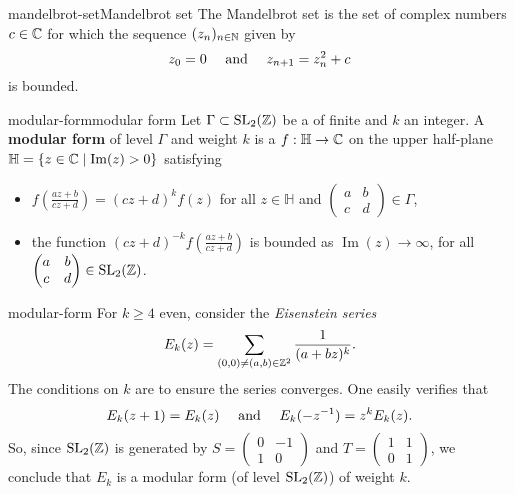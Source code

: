 \begin{topic}{mandelbrot-set}{Mandelbrot set}
    The Mandelbrot set is the set of complex numbers $c \in \mathbb{C}$ for which the sequence $(z_n)_{n \in \mathbb{N}}$ given by
    \[ z_0 = 0 \quad \textup{ and } \quad z_{n + 1} = z_n^2 + c \]
    is bounded.
\end{topic}

\begin{topic}{modular-form}{modular form}
    Let $\Gamma \subset \textup{SL}_2(\mathbb{Z})$ be a  of finite  and $k$ an integer.  A \textbf{modular form} of level $\Gamma$ and weight $k$ is a  $f : \mathbb{H} \to \mathbb{C}$ on the upper half-plane $\mathbb{H} = \{ z \in \mathbb{C} \mid \operatorname{Im}(z) > 0 \}$ satisfying
    \begin{itemize}
        \item $f\left(\frac{az + b}{cz + d}\right) = (cz + d)^k f(z)$ for all $z \in \mathbb{H}$ and $\begin{pmatrix} a & b \\ c & d \end{pmatrix} \in \Gamma$,
        \item the function $(cz + d)^{-k} f\left(\frac{az + b}{cz + d}\right)$ is bounded as $\operatorname{Im}(z) \to \infty$, for all $\begin{pmatrix} a & b \\ c & d \end{pmatrix} \in \textup{SL}_2(\mathbb{Z})$.
    \end{itemize}
\end{topic}

\begin{example}{modular-form}
    For $k \ge 4$ even, consider the \textit{Eisenstein series}
    \[ E_k(z) = \sum_{(0, 0) \ne (a, b) \in \mathbb{Z}^2} \frac{1}{(a + bz)^k} . \]
    The conditions on $k$ are to ensure the series converges. One easily verifies that
    \[ E_k(z + 1) = E_k(z) \quad \textup{ and } \quad E_k(- z^{-1}) = z^k E_k(z) . \]
    So, since $\textup{SL}_2(\mathbb{Z})$ is generated by $S = \begin{pmatrix} 0 & -1 \\ 1 & 0 \end{pmatrix}$ and $T = \begin{pmatrix} 1 & 1 \\ 0 & 1 \end{pmatrix}$, we conclude that $E_k$ is a modular form (of level $\textup{SL}_2(\mathbb{Z})$) of weight $k$.
\end{example}

